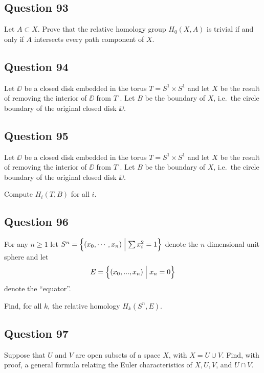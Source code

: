 \documentclass[12pt]{article}
\begin{document}
\hypertarget{question-93-2}{%
\subsection{Question 93}\label{question-93-2}}

Let \(A \subset X\). Prove that the relative homology group
\(H_0 (X, A)\) is trivial if and only if \(A\) intersects every path
component of \(X\).

\hypertarget{question-94-2}{%
\subsection{Question 94}\label{question-94-2}}

Let \(\DD\) be a closed disk embedded in the torus
\(T = S^1 \times S^1\) and let \(X\) be the result of removing the
interior of \(\DD\) from \(T\) . Let \(B\) be the boundary of \(X\),
i.e.~the circle boundary of the original closed disk \(\DD\).

\hypertarget{question-95-2}{%
\subsection{Question 95}\label{question-95-2}}

Let \(\DD\) be a closed disk embedded in the torus
\(T = S^1 \times S^1\) and let \(X\) be the result of removing the
interior of \(\DD\) from \(T\) . Let \(B\) be the boundary of \(X\),
i.e.~the circle boundary of the original closed disk \(\DD\).

Compute \(H_i (T, B)\) for all \(i\).

\hypertarget{question-96-2}{%
\subsection{Question 96}\label{question-96-2}}

For any \(n \geq 1\) let
\(S^n = \left\{{(x_0 , \cdots , x_n )\mathrel{\Big|} \sum x_i^2 =1}\right\}\) denote the
\(n\) dimensional unit sphere and let
\[E = \left\{{(x_0 , . . . , x_n )\mathrel{\Big|} x_n = 0}\right\}\] denote the
``equator''.

Find, for all \(k\), the relative homology \(H_k (S^n , E)\).

\hypertarget{question-97-2}{%
\subsection{Question 97}\label{question-97-2}}

Suppose that \(U\) and \(V\) are open subsets of a space \(X\), with
\(X = U \cup V\). Find, with proof, a general formula relating the Euler
characteristics of \(X, U, V\), and \(U \cap V\).
\end{document}

